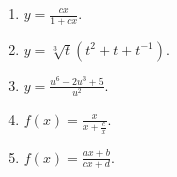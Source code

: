 \begin{problem}
\begin{multicols}{2}
\begin{enumerate}
\answer{$ $}
\item $y=\frac{c x}{1+c x}$.

\answer{$ $}
\item $y=\sqrt[3]{t}(t^2+t+t^{-1}) $.

\answer{$ $}
\item $y=\frac{u^6-2u^3+5}{u^2}$.

\answer{$ $}
\item $f(x)=\frac{x}{x+\frac{c}{x}}$.

\answer{$ $}
\item $f(x)=\frac{a x+b}{c x+ d}$.

\answer{$ $}
\end{enumerate}
\end{multicols}
\end{problem}